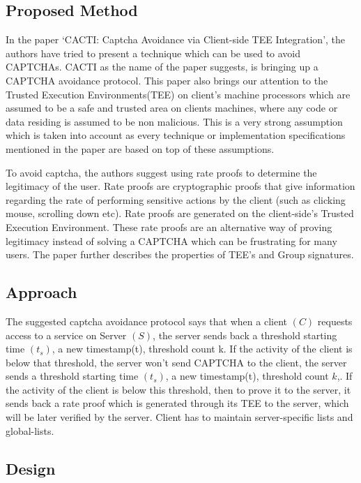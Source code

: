 \documentclass[runningheads,10pt]{llncs}
\begin{document}
	\subsection{Proposed Method}

	In the paper ‘CACTI: Captcha Avoidance via Client-side TEE Integration’, the authors have tried to present a technique which can be used to avoid CAPTCHAs. CACTI as the name of the paper suggests, is bringing up a CAPTCHA avoidance protocol. This paper also brings our attention to the Trusted Execution Environments(TEE) on client’s machine processors which are assumed to be a safe and trusted area on clients machines, where any code or data residing is assumed to be non malicious. This is a very strong assumption which is taken into account as every technique or implementation specifications mentioned in the paper are based on top of these assumptions.

	To avoid captcha, the authors suggest using rate proofs to determine the legitimacy of the user. Rate proofs are cryptographic proofs that give information regarding the rate of performing sensitive actions by the client (such as clicking mouse, scrolling down etc). Rate proofs are generated on the client-side's Trusted Execution Environment. These rate proofs are an alternative way of proving legitimacy instead of solving a CAPTCHA which can be frustrating for many users. The paper further describes the properties of TEE’s and Group signatures.

	\subsection{Approach}

	The suggested captcha avoidance protocol says that when a client $(C)$ requests access to a service on Server $(S)$, the server sends back a threshold starting time $(t_s)$, a new timestamp(t), threshold count k. If the activity of the client is below that threshold, the server won’t send CAPTCHA to the client,  the server sends a threshold starting time $(t_s)$, a new timestamp(t), threshold count  $k$,. If the activity of the client is below this threshold, then to prove it to the server, it sends back a rate proof which is generated through its TEE to the server, which will be later verified by the server. Client has to maintain server-specific lists and global-lists.

	\subsection{Design}
\end{document}
